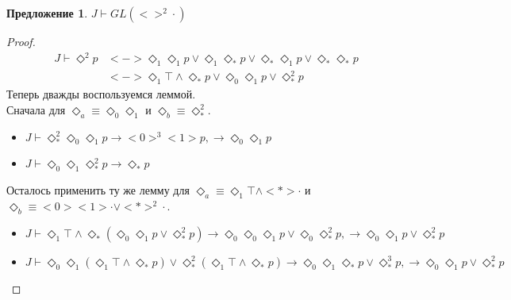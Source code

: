 \documentclass[12pt,a4paper,oneside]{article}
\newtheorem{proposition}{Предложение}
\begin{document}
  \begin{proposition}
    $J \vdash GL(<>^2\cdot)$
  \end{proposition}
  \begin{proof}
    \begin{align*}
      J \vdash \Diamond ^2 p &<-> \Diamond_1 \Diamond_1 p \vee \Diamond_1 \Diamond_* p \vee
      \Diamond_* \Diamond_1 p \vee \Diamond_* \Diamond_* p\\
      &<-> \Diamond_1 \top \wedge \Diamond_* p \vee \Diamond_0 \Diamond_1 p \vee \Diamond_* ^2 p
    \end{align*}
    Теперь дважды воспользуемся леммой. \\ Сначала для
    $\Diamond_a \equiv \Diamond_0 \Diamond_1 $ и $\Diamond_b \equiv \Diamond_* ^2$.
    \begin{itemize}
      \item $J \vdash \Diamond_* ^2\Diamond_0 \Diamond_1 p \rightarrow <0>^3<1>p, \rightarrow
            \Diamond_0 \Diamond_1 p$
      \item $J \vdash \Diamond_0 \Diamond_1 \Diamond_* ^2 p \rightarrow \Diamond_* p$
    \end{itemize}
    Осталось применить ту же лемму для $\Diamond_a \equiv \Diamond_1
    \top \wedge <*>\cdot$ и $\Diamond_b \equiv <0><1>\cdot \vee <*>^2\cdot$.
    \begin{itemize}
      \item $J \vdash \Diamond_1 \top \wedge \Diamond_* (\Diamond_0 \Diamond_1 p \vee \Diamond_* ^2
            p) \rightarrow \Diamond_0 \Diamond_0 \Diamond_1 p \vee \Diamond_0 \Diamond_* ^2 p,
            \rightarrow \Diamond_0 \Diamond_1 p \vee \Diamond_* ^2 p$
      \item $J \vdash \Diamond_0 \Diamond_1 (\Diamond_1 \top \wedge \Diamond_* p) \vee \Diamond_* ^2
            (\Diamond_1 \top \wedge \Diamond_* p) \rightarrow \Diamond_0 \Diamond_1 \Diamond_* p
            \vee \Diamond_* ^3 p, \rightarrow \Diamond_0 \Diamond_1 p \vee \Diamond_* ^2 p$
    \end{itemize}
  \end{proof}
\end{document}
